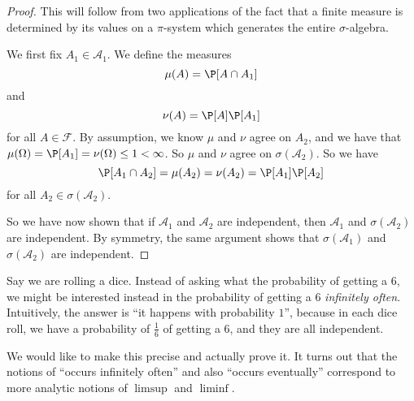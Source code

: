 \documentclass[a4paper]{article}
\begin{document}
\begin{proof}
  This will follow from two applications of the fact that a finite measure is determined by its values on a $\pi$-system which generates the entire $\sigma$-algebra.

  We first fix $A_1 \in \mathcal{A}_1$. We define the measures
  \[
    \mu(A) = \P[A \cap A_1]
  \]
  and
  \[
    \nu(A) = \P[A] \P[A_1]
  \]
  for all $A \in \mathcal{F}$. By assumption, we know $\mu$ and $\nu$ agree on $A_2$, and we have that $\mu(\Omega) = \P[A_1] = \nu(\Omega) \leq 1 < \infty$. So $\mu$ and $\nu$ agree on $\sigma(\mathcal{A}_2)$. So we have
  \[
    \P[A_1 \cap A_2] = \mu(A_2) = \nu(A_2) = \P[A_1] \P[A_2]
  \]
  for all $A_2 \in \sigma(\mathcal{A}_2)$.

  So we have now shown that if $\mathcal{A}_1$ and $\mathcal{A}_2$ are independent, then $\mathcal{A}_1$ and $\sigma(\mathcal{A}_2)$ are independent. By symmetry, the same argument shows that $\sigma(\mathcal{A}_1)$ and $\sigma(\mathcal{A}_2)$ are independent.
\end{proof}

Say we are rolling a dice. Instead of asking what the probability of getting a $6$, we might be interested instead in the probability of getting a $6$ \emph{infinitely often}. Intuitively, the answer is ``it happens with probability $1$'', because in each dice roll, we have a probability of $\frac{1}{6}$ of getting a $6$, and they are all independent.

We would like to make this precise and actually prove it. It turns out that the notions of ``occurs infinitely often'' and also ``occurs eventually'' correspond to more analytic notions of $\limsup$ and $\liminf$.
\end{document}
